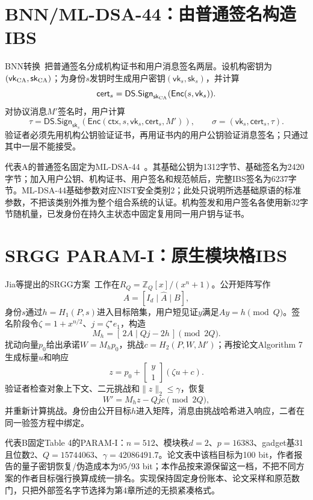 \documentclass[UTF8,a4paper,12pt,oneside,openany,fontset=fandol]{ctexrep}
\begin{document}
\section{BNN/ML-DSA-44：由普通签名构造IBS}
BNN转换~\cite{galindo2006ibs}把普通签名分成机构证书和用户消息签名两层。设机构密钥为$(\mathsf{vk}_{\rm CA},\mathsf{sk}_{\rm CA})$；为身份$s$发钥时生成用户密钥$(\mathsf{vk}_s,\mathsf{sk}_s)$，并计算
\[
  \mathsf{cert}_s=\mathsf{DS.Sign}_{\mathsf{sk}_{\rm CA}}
       (\mathsf{Enc}(s,\mathsf{vk}_s)).
\]
对协议消息$M'$签名时，用户计算
\[
  \tau=\mathsf{DS.Sign}_{\mathsf{sk}_s}
       (\mathsf{Enc}(\mathsf{ctx},s,\mathsf{vk}_s,\mathsf{cert}_s,M')),
  \qquad
  \sigma=(\mathsf{vk}_s,\mathsf{cert}_s,\tau).
\]
验证者必须先用机构公钥验证证书，再用证书内的用户公钥验证消息签名；只通过其中一层不能接受。

代表A的普通签名固定为ML-DSA-44~\cite{nist2024fips204}。其基础公钥为1312字节、基础签名为2420字节；加入用户公钥、机构证书、用户签名和规范帧后，完整IBS签名为6237字节。ML-DSA-44基础参数对应NIST安全类别2；此处只说明所选基础原语的标准参数，不把该类别外推为整个组合系统的认证。机构签发和用户签名各使用新32字节随机量，已发身份在持久主状态中固定复用同一用户钥与证书。

\section{SRGG PARAM-I：原生模块格IBS}
Jia等提出的SRGG方案~\cite{jia2025ibs}工作在$R_Q=\mathbb Z_Q[x]/(x^n+1)$。公开矩阵写作
\[
  A=[I_d\mid \widehat A\mid B],
\]
身份$s$通过$h=H_1(P,s)$进入目标陪集，用户短见证$y$满足$Ay=h\pmod Q$。签名阶段令$\zeta=1+x^{n/2}$、$j=\zeta^\star e_1$，构造
\[
  M_h=[\,2A\mid Qj-2h\,]\pmod {2Q}.
\]
扰动向量$p_0$给出承诺$W=M_hp_0$，挑战$c=H_2(P,W,M')$；再按论文Algorithm 7生成标量$u$和响应
\[
  z=p_0+\begin{bmatrix}y\\1\end{bmatrix}(\zeta u+c).
\]
验证者检查对象上下文、二元挑战和$\lVert z\rVert_2\leq\gamma$，恢复
\[
  W'=M_hz-Qjc\pmod {2Q},
\]
并重新计算挑战。身份由公开目标$h$进入矩阵，消息由挑战哈希进入响应，二者在同一验签方程中绑定。

代表B固定Table 4的PARAM-I：$n=512$、模块秩$d=2$、$p=16383$、gadget基31且位数2、$Q=15744063$、$\gamma=42086491.7$。论文表中该档目标为100 bit，作者报告的量子密钥恢复/伪造成本为95/93 bit；本作品按来源保留这一档，不把不同方案的作者目标强行换算成统一排名。实现保持固定身份账本、论文采样和原范数门，只把外部签名字节选择为第4章所述的无损紧凑格式。
\end{document}
